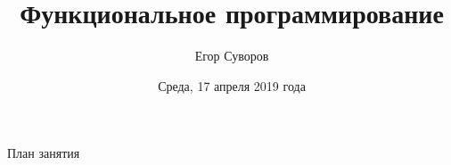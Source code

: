 \documentclass[utf8,xcolor=table]{beamer}
\title{Функциональное программирование}
\author{Егор Суворов}
\institute[СПбГУ]{Курс <<Парадигмы и языки программирования>>, группа 18.Б09-пу}
\date[17.04.2019]{Среда, 17 апреля 2019 года}
\begin{document}
\begin{frame}
\titlepage
\end{frame}

\begin{frame}{План занятия}
	\tableofcontents
\end{frame}











\end{document}
